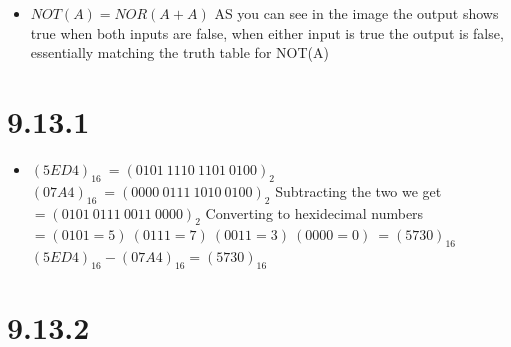 \documentclass{article}
\begin{document}
\begin{itemize}
    \item $NOT(A) = NOR(A + A)$ \newline
    \newline
    AS you can see in the image the output shows true when both inputs are false, when either input is true the output is false, essentially matching the truth table for NOT(A) \newline
    
\end{itemize}

\section{9.13.1}
\large

\begin{itemize}
    \item $(5ED4)_{16}\ = (0101\ 1110\ 1101\ 0100)_2$ \newline
    $(07A4)_{16}\ = (0000\ 0111\ 1010\ 0100)_2$ \newline
    Subtracting the two we get $= (0101\ 0111\ 0011\ 0000)_2$ \newline
    Converting to hexidecimal numbers $= (0101 = 5)\ (0111 = 7)\ (0011 = 3)\ (0000 = 0)\ = (5730)_{16}$ \newline
    $(5ED4)_{16} - (07A4)_{16} = (5730)_{16}$ \newline
\end{itemize}

\section{9.13.2}
\large
\end{document}
